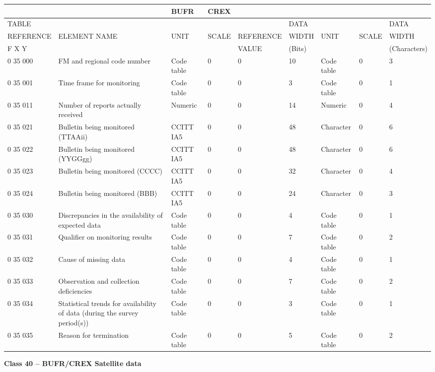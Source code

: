 \begin{longtable}[]{@{}lllllllll@{}}
\toprule
& & BUFR & CREX & & & & &\tabularnewline
\midrule
\endhead
TABLE & & & & & DATA & & & DATA\tabularnewline
REFERENCE & ELEMENT NAME & UNIT & SCALE & REFERENCE & WIDTH & UNIT & SCALE & WIDTH\tabularnewline
F X Y & & & & VALUE & (Bits) & & & (Characters)\tabularnewline
0 35 000 & FM and regional code number & Code table & 0 & 0 & 10 & Code table & 0 & 3\tabularnewline
0 35 001 & Time frame for monitoring & Code table & 0 & 0 & 3 & Code table & 0 & 1\tabularnewline
0 35 011 & Number of reports actually received & Numeric & 0 & 0 & 14 & Numeric & 0 & 4\tabularnewline
0 35 021 & Bulletin being monitored (TTAAii) & CCITT IA5 & 0 & 0 & 48 & Character & 0 & 6\tabularnewline
0 35 022 & Bulletin being monitored (YYGGgg) & CCITT IA5 & 0 & 0 & 48 & Character & 0 & 6\tabularnewline
0 35 023 & Bulletin being monitored (CCCC) & CCITT IA5 & 0 & 0 & 32 & Character & 0 & 4\tabularnewline
0 35 024 & Bulletin being monitored (BBB) & CCITT IA5 & 0 & 0 & 24 & Character & 0 & 3\tabularnewline
0 35 030 & Discrepancies in the availability of expected data & Code table & 0 & 0 & 4 & Code table & 0 & 1\tabularnewline
0 35 031 & Qualifier on monitoring results & Code table & 0 & 0 & 7 & Code table & 0 & 2\tabularnewline
0 35 032 & Cause of missing data & Code table & 0 & 0 & 4 & Code table & 0 & 1\tabularnewline
0 35 033 & Observation and collection deficiencies & Code table & 0 & 0 & 7 & Code table & 0 & 2\tabularnewline
0 35 034 & Statistical trends for availability of data (during the survey period(s)) & Code table & 0 & 0 & 3 & Code table & 0 & 1\tabularnewline
0 35 035 & Reason for termination & Code table & 0 & 0 & 5 & Code table & 0 & 2\tabularnewline
\bottomrule
\end{longtable}

\textbf{Class 40 -- BUFR/CREX Satellite data}

